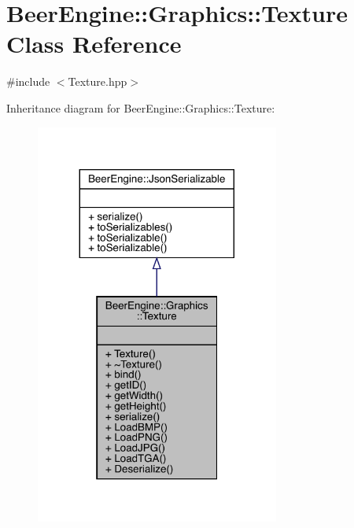 \hypertarget{class_beer_engine_1_1_graphics_1_1_texture}{}\section{Beer\+Engine\+:\+:Graphics\+:\+:Texture Class Reference}
\label{class_beer_engine_1_1_graphics_1_1_texture}


{\ttfamily \#include $<$Texture.\+hpp$>$}



Inheritance diagram for Beer\+Engine\+:\+:Graphics\+:\+:Texture\+:\nopagebreak
\begin{figure}[H]
\begin{center}
\leavevmode
\includegraphics[width=227pt]{class_beer_engine_1_1_graphics_1_1_texture__inherit__graph}
\end{center}
\end{figure}


